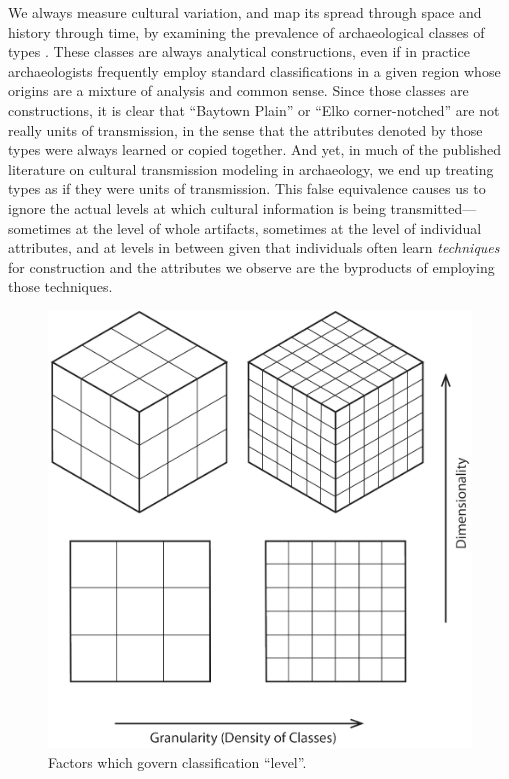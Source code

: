 We always measure cultural variation, and map its spread through space and history through time, by examining the prevalence of archaeological classes of types \citep{Dunnell1971}.  These classes are always analytical constructions, even if in practice archaeologists frequently employ standard classifications in a given region whose origins are a mixture of analysis and common sense.  Since those classes are constructions, it is clear that ``Baytown Plain'' or ``Elko corner-notched'' are not really units of transmission, in the sense that the attributes denoted by those types were always learned or copied together.  And yet, in much of the published literature on cultural transmission modeling in archaeology, we end up treating types as if they were units of transmission.  This false equivalence causes us to ignore the actual levels at which cultural information is being transmitted---sometimes at the level of whole artifacts, sometimes at the level of individual attributes, and at levels in between given that individuals often learn \emph{techniques} for construction and the attributes we observe are the byproducts of employing those techniques.  

\begin{figure}[ht!]
  \centering
  \includegraphics[scale=0.5]{graphics/conclusion/classification-granularity-dimensionality.pdf}
  \caption{Factors which govern classification ``level''.}
  \label{conc:fig:classification-granularity}
\end{figure}


